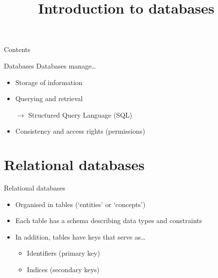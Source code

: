 

\title{Introduction to databases}



\maketitle

\begin{frame}{Contents}
    \tableofcontents[hideallsubsections]
\end{frame}

\begin{frame}{Databases}
    Databases manage\ldots
    \begin{itemize}
        \item \alert{Storage} of information \\[\bigskipamount]
        \item \alert{Querying} and retrieval
        \item[$\rightarrow$] Structured Query Language (SQL) \\[\bigskipamount]
        \item \alert{Consistency} and \alert{access rights} (permissions)
    \end{itemize}
\end{frame}

\section{Relational databases}

\begin{frame}{Relational databases}
    \begin{itemize}
        \item Organised in \alert{tables} (‘entities’ or ‘concepts’) \\[\bigskipamount]
        \item Each table has a \alert{schema} describing data types and constraints \\[\bigskipamount]
        \item In addition, tables have \alert{keys} that serve as\ldots
              \begin{itemize}
                  \item Identifiers (\alert{primary key})
                  \item Indices (\alert{secondary keys})
              \end{itemize}
    \end{itemize}
\end{frame}

